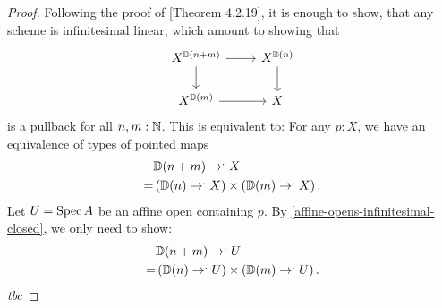 \begin{proof}
  Following the proof of \cite{david-orbifolds}[Theorem 4.2.19],
  it is enough to show, that any scheme is infinitesimal linear,
  which amount to showing that
  \[
    \begin{tikzcd}
      X^{\D(n+m)}\ar[r]\ar[d] & X^{\D(n)}\ar[d] \\
      X^{\D(m)}\ar[r]         & X
    \end{tikzcd}
  \]
  is a pullback for all $n,m:\mathbb{N}$.
  This is equivalent to:
  For any $p:X$, we have an equivalence of types of pointed maps
  \begin{align*}
    &\mathbb{D}(n+m)\to^.X \\
    = &\left(\mathbb{D}(n)\to^.X\right) \times \left({\mathbb{D}(m)}\to^.X\right).
  \end{align*}
  Let $U=\operatorname{Spec} A$ be an affine open containing $p$.
  By \cref{affine-opens-infinitesimal-closed},
  we only need to show:
  \begin{align*}
    &\mathbb{D}(n+m)\to^.U \\
    = &\left(\mathbb{D}(n)\to^.U\right) \times \left({\mathbb{D}(m)}\to^.U\right).
  \end{align*}
  \emph{tbc}
\end{proof}